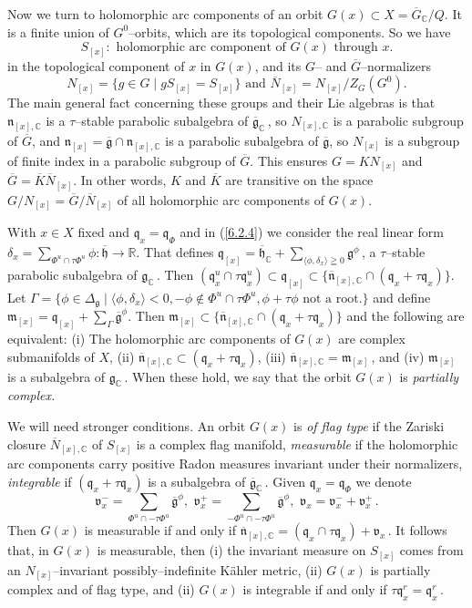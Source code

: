 \documentclass{conm-p-l}
\renewcommand{\gg}{\mathfrak{g}}
\newcommand{\gq}{\mathfrak{q}}
\def\gg{\mathfrak{g}}
\def\gh{\mathfrak{h}}
\def\gm{\mathfrak{m}}
\def\gn{\mathfrak{n}}
\def\gq{\mathfrak{q}}
\def\gv{\mathfrak{v}}
\def\C{\mathbb{C}}
\def\R{\mathbb{R}}
\begin{document}
Now we turn to holomorphic arc components of an orbit 
$G(x) \subset X = \overline{G}_\C/Q$.  It is a finite union of $G^0$--orbits,
which are its topological components.  So we have
$$
S_{[x]}: \text{ holomorphic arc component of } G(x) 
	\text{ through } x.
$$
in the topological component of $x$ in $G(x)$, 
and its $G$-- and $\overline{G}$--normalizers 
$$
N_{[x]} = \{g \in G \mid gS_{[x]} = S_{[x]}\} \text{ and }
	\overline{N}_{[x]} = N_{[x]}/Z_G(G^0).
$$
The main general fact concerning these groups and their Lie algebras
\cite[Theorems 8.5 and 8.15]{W1969} is that $\gn_{[x],\C}$ is a $\tau$--stable
parabolic subalgebra of $\overline{\gg}_\C$\,, so $N_{[x],\C}$ is a parabolic 
subgroup of $\overline{G}$, and
$\gn_{[x]} = \overline{\gg}\cap \gn_{[x],\C}$ is a parabolic subalgebra 
of $\overline{\gg}$, so $N_{[x]}$ is a subgroup of finite index in a parabolic
subgroup of $\overline{G}$.  This ensures $G=KN_{[x]}$ and $\overline{G} =
\overline{K}\overline{N}_{[x]}$. In other words, $K$ and $\overline{K}$ are
transitive on the space $G/N_{[x]} = \overline{G}/\overline{N}_{[x]}$ of all
holomorphic arc components of $G(x)$.

With $x \in X$ fixed and $\gq_x = \gq_\Phi$ and in (\ref{6.2.4}) we consider
the real linear form 
$\delta_x = \sum_{\Phi^u\cap \tau\Phi^u}\phi : \overline{\gh} \to \R$.   That
defines
$\gq_{[x]} = \overline{\gh}_\C + \sum_{\langle\phi ,\delta_x\rangle \geqq 0}
	\gg^\phi$\,,
a $\tau$--stable parabolic subalgebra of $\gg_\C$\,. Then 
$(\gq_x^u \cap \tau\gq_x^u) \subset \gq_{[x]} \subset \{\overline{\gn}_{[x],\C}
\cap (\gq_x + \tau\gq_x)\}$.  
Let $\Gamma = \{\phi \in \Delta_\gg \mid
\langle\phi,\delta_x\rangle < 0, -\phi \notin \Phi^u\cap \tau\Phi^u,
\phi+\tau\phi \text{ not a root.}\}$  and define 
$\gm_{[x]} = \gq_{[x]} + \sum_{\Gamma} \overline{\gg}^\phi$.  Then
\cite[Theorem 8.9]{W1969} $\gm_{[x]} \subset \{\overline{\gn}_{[x],\C}
\cap (\gq_x + \tau\gq_x)\}$ and the following are equivalent:
(i) The holomorphic arc components of $G(x)$ are complex
submanifolds of $X$, (ii) $\overline{\gn}_{[x],\C} \subset (\gq_x + \tau\gq_x)$,
(iii) $\overline{\gn}_{[x],\C} = \gm_{[x]}$\,, and (iv) $\gm_{[x]}$ is a
subalgebra of $\gg_\C$\,.  When these hold, we say that the orbit
$G(x)$ is {\em partially complex.}

We will need stronger conditions.  An orbit $G(x)$ is {\em of flag type}
if the Zariski closure $\overline{N}_{[x],\C}$ of $S_{[x]}$ is a 
complex flag manifold, {\em measurable} if the holomorphic arc components
carry positive Radon measures invariant under their normalizers,
{\em integrable} if $(\gq_x + \tau\gq_x)$ is a subalgebra of 
$\overline{\gg}_\C$\,.  Given $\gq_x = \gq_\Phi$ we denote
$$
\gv_x^- = \sum_{\Phi^u \cap -\tau\Phi^u}\overline{\gg}^\phi,\,\,
\gv_x^+ = \sum_{-\Phi^u \cap -\tau\Phi^u}\overline{\gg}^\phi,\,\,
\gv_x = \gv_x^- + \gv_x^+\,.
$$
Then \cite[Theorem 9.2]{W1969} $G(x)$ is measurable if and only
if $\overline{\gn}_{[x],\C} = (\gq_x \cap \tau\gq_x) + \gv_x$\,.  It follows
that, in $G(x)$ is measurable, then (i) the invariant measure on $S_{[x]}$
comes from an $N_{[x]}$--invariant possibly--indefinite K\"ahler metric, (ii)
$G(x)$ is partially complex and of flag type, and (ii) $G(x)$ is integrable
if and only if $\tau\gq_x^r = \gq_x^r$\,.  
\end{document}
